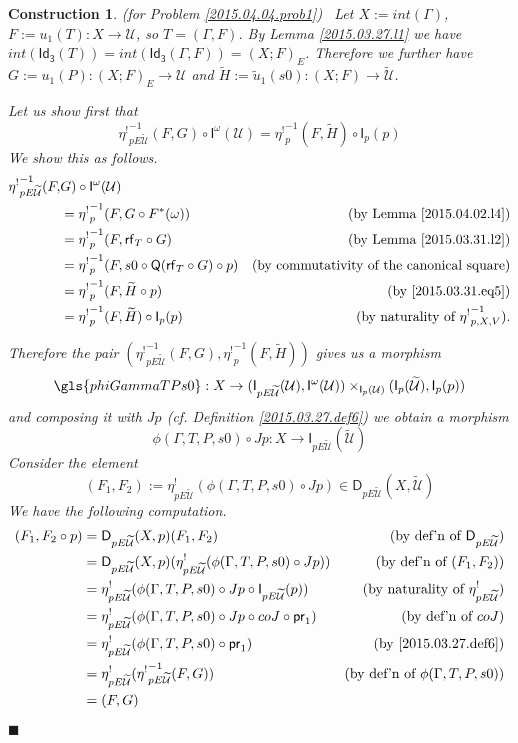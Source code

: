 \documentclass[12pt]{article}
\numberwithin{equation}{section}
\newtheorem{construction0}[proposition]{Construction}
\newenvironment{construction}[1]{\begin{construction0}(for Problem \ref{#1})\ }{$\blacksquare$ \end{construction0}}
\newcommand{\by}[1]{\text{(by #1)}}
\newcommand{\sr}{\rightarrow}
\newcommand{\wt}{\widetilde}
\newcommand{\Idx}{\mathsf{Id_3}} %
\newcommand{\U}{\mathcal{U}}
\newcommand{\D}{\mathsf{D}}
\newcommand{\I}{\mathsf{I}}
\newcommand{\rf}{\mathsf{rf}}
\newcommand{\Q}{\mathsf{Q}}
\newcommand{\etashriek}{\eta^!}
\newcommand{\etaunshriek}{{\etashriek}^{-1}}
\newcommand{\pr}{\mathsf{pr}}
\begin{document}
\begin{construction}{2015.04.04.prob1}\rm
\label{2015.04.04.constr1} Let $X:=int(\Gamma)$, $F:=u_1(T):X\sr \U$, so $T = (\Gamma,F)$. By Lemma
\ref{2015.03.27.l1} we have
$int(\Idx(T))=int(\Idx(\Gamma,F))=(X;F)_{E}$. Therefore we further
have $G:=u_1(P):(X;F)_{E}\sr \U$ and $\wt{H}:=\wt{u}_1(s0):(X;F)\sr
\wt{\U}$.

Let us show first that
%
$$\etaunshriek_{pE\wt{\U}}(F,G)\circ \I^{\omega}(\U)=\etaunshriek_p(F,\wt{H})\circ \I_p(p)$$
%
We show this as follows.
%
\begin{align*}
  \etaunshriek_{pE\wt{\U}}(F,&G) \circ \I^{\omega}(\U) \\
    & = \etaunshriek_p(F,G\circ F^*(\omega)) & \by{Lemma \ref{2015.04.02.l4}} \\
    & = \etaunshriek_p(F,\rf_T\circ G) & \by{Lemma \ref{2015.03.31.l2}}  \\
    & = \etaunshriek_p(F,s0\circ \Q(\rf_T\circ G)\circ p) & \by{commutativity of the canonical square}  \\
    & = \etaunshriek_p(F,\wt{H}\circ p) & \by{\ref{2015.03.31.eq5}}  \\
    & = \etaunshriek_p(F,\wt{H})\circ \I_p(p) & \by{naturality of $\etaunshriek_{p,X,V}$}.
\end{align*}

Therefore the pair $(\etaunshriek_{pE\wt{\U}}(F,G),\etaunshriek_p(F,\wt{H}))$ gives us a
morphism
%
$$\gls{phiGammaTPs0} : X \sr (\I_{pE\wt{\U}}(\U), \I^{\omega}(\U)) \times_{\I_p(\U)}
(\I_p(\wt{\U}),\I_p(p))$$
%
and composing it with $Jp$ (cf. Definition \ref{2015.03.27.def6}) we obtain a
morphism
%
$$\phi(\Gamma,T,P,s0)\circ Jp: X\sr \I_{pE\wt{\U}}(\wt{\U})$$
%
Consider the element
%
$$(F_1,F_2) := \etashriek_{pE\wt{\U}}(\phi(\Gamma,T,P,s0)\circ Jp)\in
\D_{pE\wt{\U}}(X,\wt{\U})$$
%
We have the following computation.
%
\begin{align*}
  (F_1,F_2\circ p)
  & = \D_{pE\wt{\U}}(X,p)(F_1,F_2)  & \by{def'n of $\D_{pE\wt{\U}}$} \\
  & = \D_{pE\wt{\U}}(X,p)(\etashriek_{pE\wt{\U}}(\phi(\Gamma,T,P,s0)\circ Jp))  & \by{def'n of $(F_1,F_2)$} \\
  & = \etashriek_{pE\wt{\U}}(\phi(\Gamma,T,P,s0)\circ Jp\circ \I_{pE\wt{\U}}(p))  & \by{naturality of $\etashriek_{pE\wt{\U}}$} \\
  & = \etashriek_{pE\wt{\U}}(\phi(\Gamma,T,P,s0)\circ Jp\circ coJ \circ \pr_1)  & \by{def'n of $coJ$} \\
  & = \etashriek_{pE\wt{\U}}(\phi(\Gamma,T,P,s0)\circ \pr_1)  & \by{\ref{2015.03.27.def6}} \\
  & = \etashriek_{pE\wt{\U}}(\etaunshriek_{pE\wt{\U}}(F,G)) & \by{def'n of $\phi(\Gamma,T,P,s0)$} \\
  & =(F,G)
\end{align*}


\end{construction}
\end{document}
